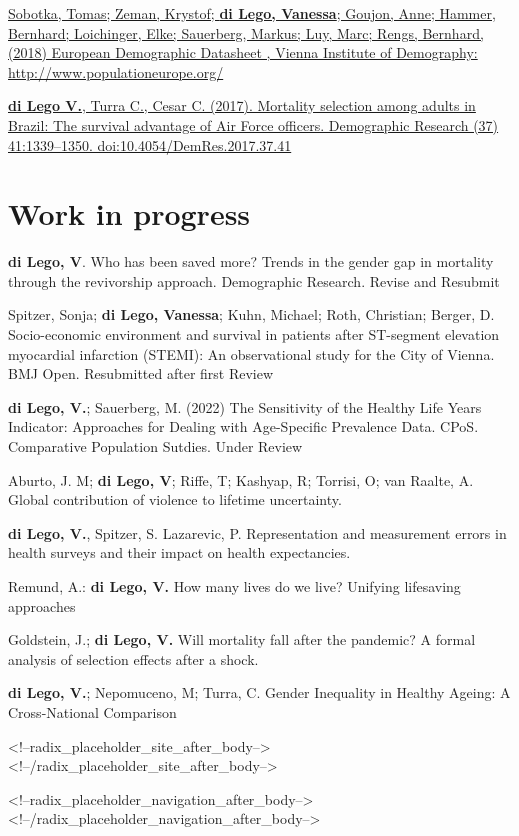 \documentclass[
]{article}
\begin{document}
\href{https://www.oeaw.ac.at/vid/data/demographic-data-sheets/european-demographic-data-sheet-2018}{Sobotka,
Tomas; Zeman, Krystof; \textbf{di Lego, Vanessa}; Goujon, Anne; Hammer,
Bernhard; Loichinger, Elke; Sauerberg, Markus; Luy, Marc; Rengs,
Bernhard, (2018) European Demographic Datasheet , Vienna Institute of
Demography: http://www.populationeurope.org/}

\href{https://www.demographic-research.org/volumes/vol37/41/default.htm}{\textbf{di
Lego V.}, Turra C., Cesar C. (2017). Mortality selection among adults in
Brazil: The survival advantage of Air Force officers. Demographic
Research (37) 41:1339--1350. doi:10.4054/DemRes.2017.37.41}

\hypertarget{work-in-progress}{%
\section{Work in progress}\label{work-in-progress}}

\textbf{di Lego, V}. Who has been saved more? Trends in the gender gap
in mortality through the revivorship approach. Demographic Research.
Revise and Resubmit

Spitzer, Sonja; \textbf{di Lego, Vanessa}; Kuhn, Michael; Roth,
Christian; Berger, D. Socio-economic environment and survival in
patients after ST-segment elevation myocardial infarction (STEMI): An
observational study for the City of Vienna. BMJ Open. Resubmitted after
first Review

\textbf{di Lego, V.}; Sauerberg, M. (2022) The Sensitivity of the
Healthy Life Years Indicator: Approaches for Dealing with Age-Specific
Prevalence Data. CPoS. Comparative Population Sutdies. Under Review

Aburto, J. M; \textbf{di Lego, V}; Riffe, T; Kashyap, R; Torrisi, O; van
Raalte, A. Global contribution of violence to lifetime uncertainty.

\textbf{di Lego, V.}, Spitzer, S. Lazarevic, P. Representation and
measurement errors in health surveys and their impact on health
expectancies.

Remund, A.: \textbf{di Lego, V.} How many lives do we live? Unifying
lifesaving approaches

Goldstein, J.; \textbf{di Lego, V.} Will mortality fall after the
pandemic? A formal analysis of selection effects after a shock.

\textbf{di Lego, V.}; Nepomuceno, M; Turra, C. Gender Inequality in
Healthy Ageing: A Cross-National Comparison

<!--radix_placeholder_site_after_body-->
<!--/radix_placeholder_site_after_body-->

<!--radix_placeholder_navigation_after_body-->
<!--/radix_placeholder_navigation_after_body-->
\end{document}
